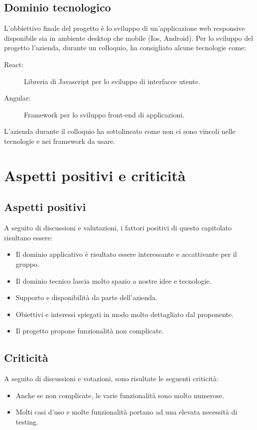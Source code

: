 \documentclass[12pt]{report}
\begin{document}
\subsection{Dominio tecnologico}

L'obbiettivo finale del progetto è lo sviluppo di un'applicazione web responsive disponibile sia in ambiente desktop che mobile (Ios, Android). Per lo sviluppo del progetto l'azienda, durante un colloquio, ha consigliato alcune tecnologie come: 
\begin{description}
    \item[React:] Libreria di Javascript per lo sviluppo di interfacce utente.
    \item[Angular:] Framework per lo sviluppo front-end di applicazioni.
\end{description}
L'azienda durante il colloquio ha sottolineato come non ci sono vincoli nelle tecnologie e nei framework da usare. 

\section{Aspetti positivi e criticità}
\subsection{Aspetti positivi}
A seguito di discussioni e valutazioni, i fattori positivi di questo capitolato risultano essere:
\begin{itemize}
  \item Il dominio applicativo è risultato essere interessante e accattivante per il gruppo.
  \item Il dominio tecnico lascia molto spazio a nostre idee e tecnologie.
  \item Supporto e disponibilità da parte dell'azienda.
  \item Obiettivi e interessi spiegati in modo molto dettagliato dal proponente.
  \item Il progetto propone funzionalità non complicate.
\end{itemize}

\subsection{Criticità}
A seguito di discussioni e votazioni, sono risultate le seguenti criticità:
\begin{itemize}
  \item Anche se non complicate, le varie funzionalità sono molto numerose.
  \item Molti casi d'uso e molte funzionalità portano ad una elevata necessità di testing.
\end{itemize}
\end{document}
